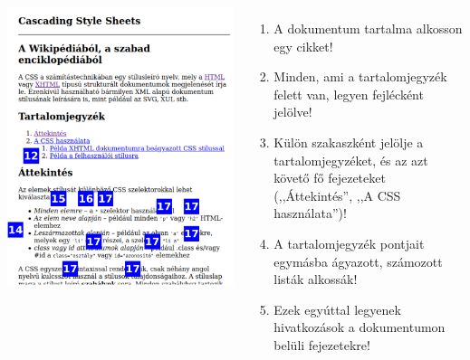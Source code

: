 \begin{frame}
  \begin{columns}[c]
      \begin{exampleblock}{}
        \includegraphics[width=\textwidth]{css2.pdf}
      \end{exampleblock}
      \begin{enumerate}
        \footnotesize
        \setcounter{enumi}{\thefeladatSzamlalo}
        \item A dokumentum tartalma alkosson egy cikket!
        \item Minden, ami a tartalomjegyzék felett van, legyen fejlécként jelölve!
        \item Külön szakaszként jelölje a tartalomjegyzéket, és az azt követő fő fejezeteket (,,Áttekintés'', ,,A CSS használata'')!
        \item A tartalomjegyzék pontjait egymásba ágyazott, számozott listák alkossák!
        \item Ezek egyúttal legyenek hivatkozások a dokumentumon belüli fejezetekre!

\end{enumerate}
\end{columns}
\end{frame}
